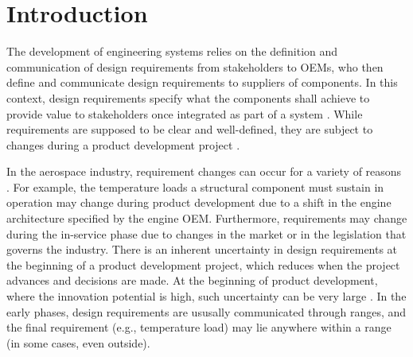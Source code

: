 \chapter{Introduction}
\label{ch:intro}

The development of engineering systems relies on the definition and communication of design requirements from stakeholders to \acp{OEM}, who then define and communicate design requirements to suppliers of components. In this context, design requirements specify what the components shall achieve to provide value to stakeholders once integrated as part of a system \cite{Blanchard1981}. While requirements are supposed to be clear and well-defined, they are subject to changes during a product development project \cite{Peterson2007}. 

In the aerospace industry, requirement changes can occur for a variety of reasons \cite{Boeing2013,Eckert2004}. For example, the temperature loads a structural component must sustain in operation may change during product development due to a shift in the engine architecture specified by the engine \ac{OEM}. Furthermore, requirements may change during the in-service phase due to changes in the market or in the legislation that governs the industry. There is an inherent uncertainty in design requirements at the beginning of a product development project, which reduces when the project advances and decisions are made. At the beginning of product development, where the innovation potential is high, such uncertainty can be very large \cite{ullman2009mechanical}. In the early phases, design requirements are ususally communicated through ranges, and the final requirement (e.g., temperature load) may lie anywhere within a range (in some cases, even outside). 

